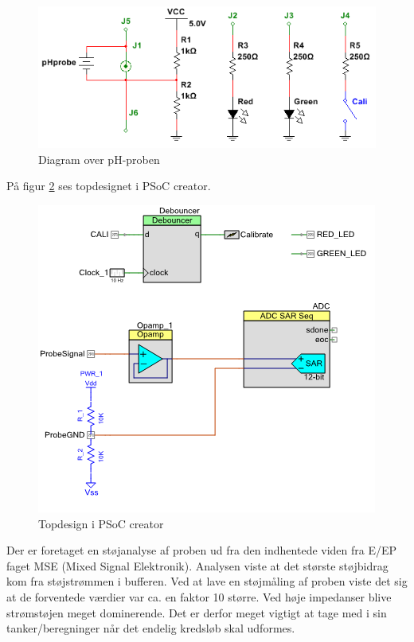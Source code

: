 \begin{figure}[H]
	\centering 
	\includegraphics[scale=0.8]{Projektbeskrivelse/DesignOgImplementeringAfHW/pHbilleder/Schematic.png}
	\caption{Diagram over pH-proben}
	\label{photo:Schematic_ph}
\end{figure} 
På figur \ref{photo:PSoC_Creator_ph} ses topdesignet i PSoC creator.
\begin{figure}[H]
	\centering 
	\includegraphics[scale=0.8]{Projektbeskrivelse/DesignOgImplementeringAfHW/pHbilleder/TopDesign.png}
	\caption{Topdesign i PSoC creator}
	\label{photo:PSoC_Creator_ph}
\end{figure} 
Der er foretaget en støjanalyse af proben ud fra den indhentede viden fra E/EP faget MSE (Mixed Signal Elektronik). Analysen viste at det største støjbidrag kom fra støjstrømmen i bufferen. Ved at lave en støjmåling af proben viste det sig at de forventede værdier var ca. en faktor 10 større. Ved høje impedanser blive strømstøjen meget dominerende. Det er derfor meget vigtigt at tage med i sin tanker/beregninger når det endelig kredsløb skal udformes.

